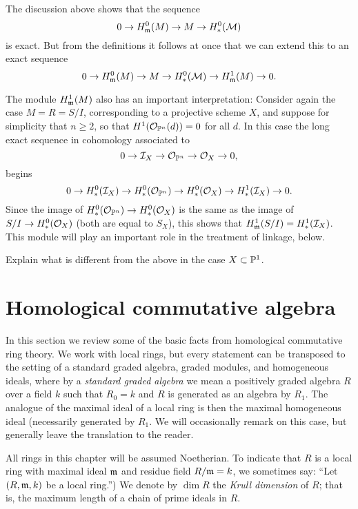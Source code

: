The discussion above shows that the sequence
$$
0 \to H^{0}_{\gm} (M) \to M\to H^{0}_{*}(\cM)
$$
is exact. But from the definitions it follows at once that we can extend this to an exact sequence
$$
0 \to H^{0}_{\gm} (M) \to M\to H^{0}_{*}(\cM) \to H^{1}_{\gm} (M) \to 0.
$$

The module $H^{1}_{\gm}(M)$ also has an important interpretation: Consider again the case $M = R = S/I$, corresponding to a projective scheme $X$, and suppose for simplicity that 
$n\geq 2$, so that $H^{1}(\cO_{\PP^{n}}(d)) = 0$ for all $d$. In this case the long exact sequence in cohomology associated to 
$$
0\to \cI_{X} \to \cO_{\PP^{n}} \to \cO_{X}\to 0,
$$
begins
$$
0\to H^{0}_{*}(\cI_{X}) \to H^{0}_{*}(\cO_{\PP^{n}}) \to H^{0}_{*}(\cO_{X})\to H^{1}_{*}(\cI_{X}) \to 0.
$$
Since the image of $H^{0}_{*}(\cO_{\PP^{n}}) \to H^{0}_{*}(\cO_{X})$ is  the same as
the image of $S/I \to H^{0}_{*}(\cO_{X})$ (both are equal to $S_{X}$), 
this shows that $H^{1}_{\gm}(S/I) = H^{1}_{*}(\cI_{X})$. This module will play an important role in the treatment of linkage, below.

\begin{exercise}
 Explain what is different from the above in the case $X\subset \PP^{1}$.
\end{exercise}

\section{Homological commutative algebra} 


In this section we review some of the basic facts from homological commutative ring theory. We work
with local rings, but every statement can be transposed to the setting of a standard graded algebra, graded modules, and homogeneous ideals, where by a \emph{standard graded algebra} we mean a positively graded algebra $R$ over a field $k$ such that $R_{0} = k$ and $R$ is generated as an algebra by $R_{1}$. The analogue of the maximal ideal of a local ring is then the maximal homogeneous ideal (necessarily generated by $R_{1}$. We will occasionally remark on this case, but generally leave the translation to the reader.

All rings in this chapter will be assumed Noetherian. To indicate that $R$ is a local ring with maximal ideal $\gm$ and residue field $R/\gm = k$, we sometimes  say: ``Let $(R,\gm,k)$ be a local ring.'') We denote by $\dim R$ the \emph{Krull dimension} of $R$; that is, the maximum length of a chain of prime ideals in $R$.

